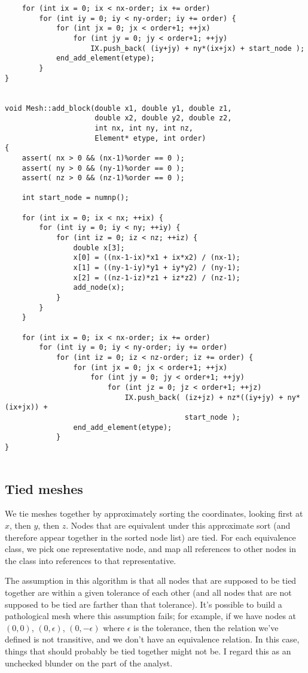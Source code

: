 \begin{verbatim}
    for (int ix = 0; ix < nx-order; ix += order)
        for (int iy = 0; iy < ny-order; iy += order) {
            for (int jx = 0; jx < order+1; ++jx)
                for (int jy = 0; jy < order+1; ++jy)
                    IX.push_back( (iy+jy) + ny*(ix+jx) + start_node );
            end_add_element(etype);
        }
}


void Mesh::add_block(double x1, double y1, double z1,
                     double x2, double y2, double z2,
                     int nx, int ny, int nz,
                     Element* etype, int order)
{
    assert( nx > 0 && (nx-1)%order == 0 );
    assert( ny > 0 && (ny-1)%order == 0 );
    assert( nz > 0 && (nz-1)%order == 0 );

    int start_node = numnp();

    for (int ix = 0; ix < nx; ++ix) {
        for (int iy = 0; iy < ny; ++iy) {
            for (int iz = 0; iz < nz; ++iz) {
                double x[3];
                x[0] = ((nx-1-ix)*x1 + ix*x2) / (nx-1);
                x[1] = ((ny-1-iy)*y1 + iy*y2) / (ny-1);
                x[2] = ((nz-1-iz)*z1 + iz*z2) / (nz-1);
                add_node(x);
            }
        }
    }

    for (int ix = 0; ix < nx-order; ix += order)
        for (int iy = 0; iy < ny-order; iy += order)
            for (int iz = 0; iz < nz-order; iz += order) {
                for (int jx = 0; jx < order+1; ++jx)
                    for (int jy = 0; jy < order+1; ++jy)
                        for (int jz = 0; jz < order+1; ++jz)
                            IX.push_back( (iz+jz) + nz*((iy+jy) + ny*(ix+jx)) +
                                          start_node );
                end_add_element(etype);
            }
}


\end{verbatim}
\subsection{Tied meshes}

We tie meshes together by approximately sorting the coordinates,
looking first at $x$, then $y$, then $z$.  Nodes that are
equivalent under this approximate sort (and therefore appear
together in the sorted node list) are tied.  For each equivalence
class, we pick one representative node, and map all references to
other nodes in the class into references to that representative.

The assumption in this algorithm is that all nodes that are
supposed to be tied together are within a given tolerance of each
other (and all nodes that are not supposed to be tied are farther
than that tolerance).  It's possible to build a pathological mesh
where this assumption fails; for example, if we have nodes at
$(0,0)$, $(0,\epsilon)$, $(0,-\epsilon)$ where $\epsilon$ is the
tolerance, then the relation we've defined is not transitive, and
we don't have an equivalence relation.  In this case, things that
should probably be tied together might not be.  I regard this as
an unchecked blunder on the part of the analyst.

